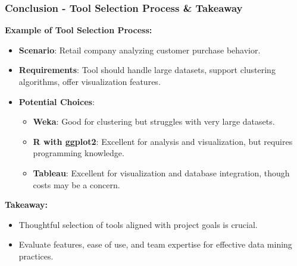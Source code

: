 \documentclass[aspectratio=169]{beamer}
\begin{document}
\begin{frame}[fragile]
    \frametitle{Conclusion - Tool Selection Process & Takeaway}

    \textbf{Example of Tool Selection Process:}
    \begin{itemize}
        \item \textbf{Scenario}: Retail company analyzing customer purchase behavior.
        \item \textbf{Requirements}: Tool should handle large datasets, support clustering algorithms, offer visualization features.
        \item \textbf{Potential Choices}:
        \begin{itemize}
            \item \textbf{Weka}: Good for clustering but struggles with very large datasets.
            \item \textbf{R with ggplot2}: Excellent for analysis and visualization, but requires programming knowledge.
            \item \textbf{Tableau}: Excellent for visualization and database integration, though costs may be a concern.
        \end{itemize}
    \end{itemize}

    \textbf{Takeaway:} 
    \begin{itemize}
        \item Thoughtful selection of tools aligned with project goals is crucial.
        \item Evaluate features, ease of use, and team expertise for effective data mining practices.
    \end{itemize}
\end{frame}
\end{document}
